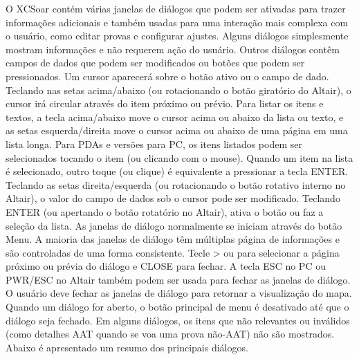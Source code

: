 O XCSoar contém várias janelas de diálogos que podem ser ativadas para trazer informações adicionais e também usadas para uma interação mais complexa com o usuário, como editar provas e configurar ajustes.
Alguns diálogos simplesmente mostram informações e não requerem ação do usuário.  Outros diálogos contêm campos de dados que podem ser modificados ou botões que podem ser pressionados.
Um cursor aparecerá sobre o botão ativo ou o campo de dado.  Teclando nas setas acima/abaixo (ou rotacionando o botão giratório do Altair), o cursor irá circular através do item próximo ou prévio.  Para listar os itens e textos, a tecla acima/abaixo move o cursor acima ou abaixo da lista ou texto, e as setas esquerda/direita move o cursor acima ou abaixo de uma página em uma lista longa.
Para PDAs e versões para PC, os itens listados podem ser selecionados tocando o item (ou clicando com o mouse).  Quando um item na lista é selecionado, outro toque (ou clique) é equivalente a pressionar a tecla ENTER.
Teclando as setas direita/esquerda (ou rotacionando o botão rotativo interno no Altair), o valor do campo de dados sob o cursor pode ser modificado.  Teclando ENTER (ou apertando o botão rotatório no Altair), ativa o botão ou faz a seleção da lista.
As janelas de diálogo normalmente se iniciam através do botão Menu.
A maioria das janelas de diálogo têm múltiplas página de informações e são controladas de uma forma consistente.  Tecle \bmenuw{$<$}> ou \bmenuw{$>$} para selecionar a página próximo ou prévia do diálogo e CLOSE para fechar.
A tecla ESC no PC ou PWR/ESC no Altair também podem ser usada para fechar as janelas de diálogo.
O usuário deve fechar as janelas de diálogo para retornar a visualização do mapa.  Quando um diálogo for aberto, o botão principal de menu é desativado até que o diálogo seja fechado.
Em alguns diálogos, os itens que não relevantes ou inválidos (como detalhes AAT quando se voa uma prova não-AAT) não são mostrados.
 Abaixo é apresentado um resumo dos principais diálogos.


